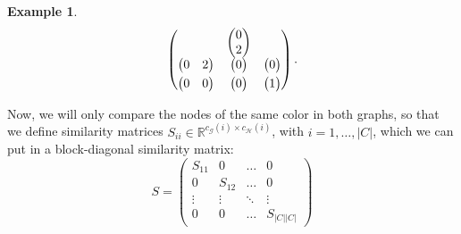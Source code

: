 \documentclass[a4paper,11pt]{report}
\newtheorem{example}[theorem]{Example}
\newcommand{\R}{{\mathbb R}}
\newcommand{\graf}{\mathscr{G}}
\newcommand{\grafeen}{\mathscr{H}}
\begin{document}
\begin{example}
$$\begin{pmatrix}
& \begin{pmatrix}
0\\
2\\
\end{pmatrix}\\ \smallskip
 \begin{pmatrix}
0 & 2\\
\end{pmatrix} & \begin{pmatrix}
 0\\
\end{pmatrix} & \begin{pmatrix}
 0\\
\end{pmatrix}\\
\begin{pmatrix}
 0 & 0\\
\end{pmatrix} & \begin{pmatrix}
 0\\
\end{pmatrix} & \begin{pmatrix}
 1\\
\end{pmatrix}\\
\end{pmatrix} .$$
\end{example}
Now, we will only compare the nodes of the same color in both graphs, so that we 
define similarity matrices $S_{ii} \in \R^{c_\graf(i)\times c_\grafeen(i)}$, with 
$i=1,\ldots,|C|$, which we can put in a block-diagonal similarity matrix:
$$S = \begin{pmatrix}
S_{11} & 0 & \ldots & 0\\
0 & S_{12} & \ldots & 0\\
\vdots & \vdots & \ddots & \vdots\\
0 & 0 & \ldots & S_{|C||C|}
\end{pmatrix}$$
\end{document}
